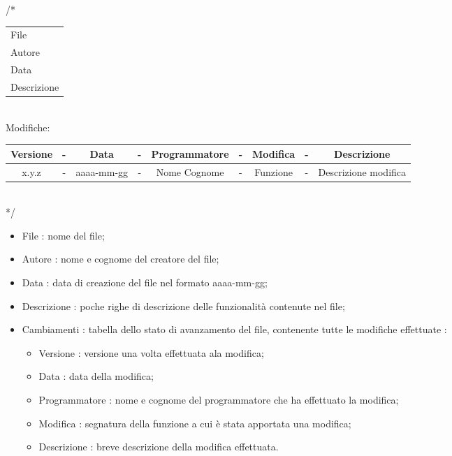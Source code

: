 \begin{flushleft}

/*\\
\vspace{3mm}
\begin{tabular}{l}
	File\\
	Autore\\
	Data\\
	Descrizione\\
\end{tabular}\\
\vspace{5mm}
 Modifiche:\\
 \vspace{3mm}
\begin{tabular}{| c c c c c c c c c |}
	\hline
	Versione & - & Data & - & Programmatore & - & Modifica & - & Descrizione\\
	\hline
	x.y.z & - & aaaa-mm-gg & - & Nome Cognome & - & Funzione & - & Descrizione modifica\\
	\hline
\end{tabular}\\
\vspace{3mm}
*/\\

\end{flushleft}

\begin{itemize}
	\item File : nome del file;
	\item Autore : nome e cognome del creatore del file;
	\item Data : data di creazione del file nel formato aaaa-mm-gg;
	\item Descrizione : poche righe di descrizione delle funzionalità contenute nel file;
	\item Cambiamenti : tabella dello stato di avanzamento del file, contenente tutte le modifiche effettuate :
		\begin{itemize}
			\item Versione : versione una volta effettuata ala modifica;
			\item Data : data della modifica;
			\item Programmatore : nome e cognome del programmatore che ha effettuato la modifica;
			\item Modifica : segnatura della funzione a cui è stata apportata una modifica;
			\item Descrizione : breve descrizione della modifica effettuata.
		\end{itemize}
\end{itemize}

